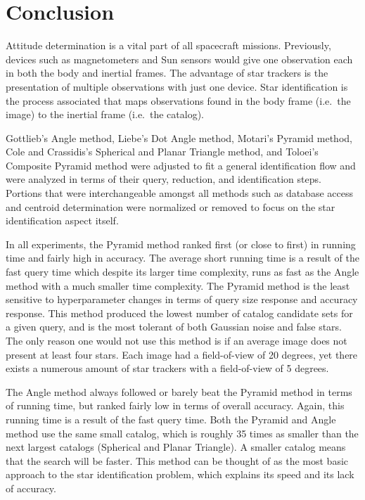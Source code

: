 \section{Conclusion}\label{sec:conclusion}
Attitude determination is a vital part of all spacecraft missions.
Previously, devices such as magnetometers and Sun sensors would give one observation each in both the body and inertial
frames.
The advantage of star trackers is the presentation of multiple observations with just one device.
Star identification is the process associated that maps observations found in the body frame (i.e.\ the image) to the
inertial frame (i.e.\ the catalog).

Gottlieb's Angle method, Liebe's Dot Angle method, Motari's Pyramid method, Cole and Crassidis's Spherical and
Planar Triangle method, and Toloei's Composite Pyramid method were adjusted to fit a general identification flow
and were analyzed in terms of their query, reduction, and identification steps.
Portions that were interchangeable amongst all methods such as database access and centroid determination were
normalized or removed to focus on the star identification aspect itself.

In all experiments, the Pyramid method ranked first (or close to first) in running time and fairly high in accuracy.
The average short running time is a result of the fast query time which despite its larger time complexity, runs as
fast as the Angle method with a much smaller time complexity.
The Pyramid method is the least sensitive to hyperparameter changes in terms of query size response and accuracy
response.
This method produced the lowest number of catalog candidate sets for a given query, and is the most tolerant of
both Gaussian noise and false stars.
The only reason one would not use this method is if an average image does not present at least four stars.
Each image had a field-of-view of 20 degrees, yet there exists a numerous amount of star trackers with a field-of-view
of 5 degrees.

The Angle method always followed or barely beat the Pyramid method in terms of running time, but ranked fairly
low in terms of overall accuracy.
Again, this running time is a result of the fast query time.
Both the Pyramid and Angle method use the same small catalog, which is roughly 35 times as smaller than the next
largest catalogs (Spherical and Planar Triangle).
A smaller catalog means that the search will be faster.
This method can be thought of as the most basic approach to the star identification problem, which explains its speed
and its lack of accuracy.

